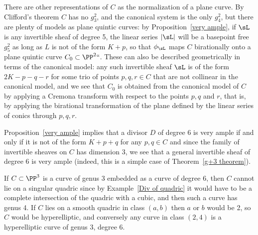 There are other representations of $C$ as the normalization of a plane
curve. By
Clifford's theorem
%
 $C$ has no $g^2_3$, and the canonical system
is the only $g^2_4$, but there are plenty of models as plane
quintic curves:
%
by Proposition~\ref{very ample}, if $\sL$ is any invertible sheaf
of degree 5, the linear series $|\sL|$ will be a basepoint free $g^2_5$
as long as $L$ is not of the form $K+p$, so that $\phi_\sL$ maps $C$
birationally
onto a
plane quintic curve
%
$C_0 \subset \PP^2` `$. These can
also be described geometrically in terms of the canonical model: any
such invertible sheaf $\sL$ is of the form $2K-p-q-r$ for some trio of
points $p, q, r \in C$ that are not collinear in the
canonical model,
%
and we see  that $C_0$ is obtained from the canonical model of $C$ by
applying a
Cremona transform
%
with respect to the points $p, q$ and $r$,
that is, by applying the birational transformation
of the plane defined by the linear series of conics through $p,q,r$.

Proposition~\ref{very ample} implies that a divisor $D$ of degree 6 is
very ample if and only if it is not of the form $K+p+q$ for any $p, q
\in C$ and since the family of invertible sheaves on $C$ has dimension 3,
we see that a general invertible sheaf of degree 6 is very ample (indeed,
this is a simple case of Theorem~\ref{g+3 theorem}).

If $C\subset \PP^3$ is a curve of genus 3 embedded as a curve of degree
6, then $C$ cannot lie on a singular quadric since by
Example~\ref{Div of quadric} it would
have to be a complete intersection of the quadric with a cubic, and then
such a curve has genus 4. If $C$ lies on a smooth quadric
in class $(a,b)$ then $a$ or $b$ would be 2, so $C$ would be
hyperelliptic, and conversely any curve in class $(2,4)$
is a hyperelliptic curve of genus 3, degree 6.

